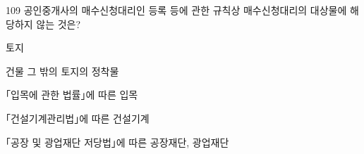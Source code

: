\begin{question}{109}
공인중개사의 매수신청대리인 등록 등에 관한 규칙상 매수신청대리의 대상물에 해당하지 않는 것은?
\begin{choices}
  \item 토지
  \item 건물 그 밖의 토지의 정착물
  \item ｢입목에 관한 법률｣에 따른 입목
  \item ｢건설기계관리법｣에 따른 건설기계
  \item ｢공장 및 광업재단 저당법｣에 따른 공장재단, 광업재단
\end{choices}
\end{question}
